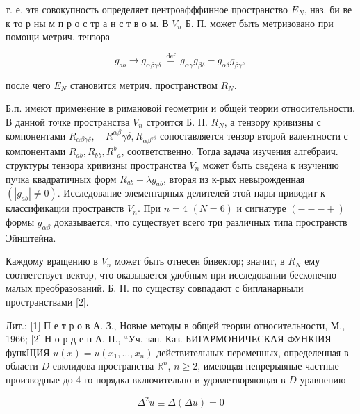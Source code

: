 \documentclass[10pt]{article}
\begin{document}
т. е. эта совокупность определяет центроафффинное пространство $E_{N}$, наз. би ве к то р ны м п р о с тр а н с т в о м. В $V_{n}$ Б. П. может быть метризовано при помощи метрич. тензора



\[

g_{a b} \longrightarrow g_{\alpha \beta \gamma \delta} \stackrel{\text { def }}{=} g_{\alpha \gamma} g_{\beta \delta}-g_{\alpha \delta} g_{\beta \gamma},

\]



после чего $E_{N}$ становится метрич. пространством $R_{N}$.



Б.п. имеют применение в римановой геометрии и общей теории относительности. В данной точке пространства $V_{n}$ строится Б. П. $R_{N}$, а тензору кривизны с компонентами $R_{\alpha \beta \gamma \delta}, \quad R^{\alpha \beta} \gamma \delta, R_{\alpha \beta^{\gamma \delta}}$ сопоставляется тензор второй валентности с компонентами $R_{a b}, R_{b}{ }_{b}, R^{b}{ }_{a}$, соответственно. Тогда задача изучения алгебраич. структуры тензора кривизны пространства $V_{n}$ может быть сведена к изучению пучка квадратичных форм $R_{a b}-\lambda g_{a b}$, вторая из к-рых невырожденная $\left(\left|g_{a b}\right| \neq 0\right)$. Исследование элементарных делителей этой пары приводит к классификации пространств $V_{n}$. При $n=4$ $(N=6)$ и сигнатуре $(---+)$ формы $g_{\alpha \beta}$ доказывается, что существует всего три различных типа пространств Эйнштейна.



Каждому вращению в $V_{n}$ может быть отнесен бивектор; значит, в $R_{N}$ ему соответствует вектор, что оказывается удобным при исследовании бесконечно малых преобразований. Б. П. по существу совпадают с бипланарныли пространствами [2].



Лит.: [1] П е т р о в А. З., Новые методы в общей теории относительности, М., 1966; [2] Н о р д е н А. П., “Уч. зап. Каз. БИГАРМОНИЧЕСКАЯ ФУНКІИЯ - функЩИЯ $u(x)=u\left(x_{1}, \ldots, x_{n}\right)$ действительных переменных, определенная в области $D$ евклидова пространства $\mathbb{R}^{n}$, $n \geqslant 2$, имеющая непрерывные частные производные до 4-го порядка включительно и удовлетворяющая в $D$ уравнению



\[

\Delta^{2} u \equiv \Delta(\Delta u)=0

\]
\end{document}
